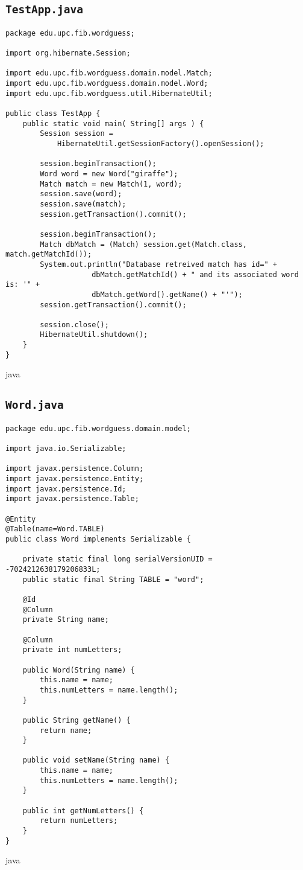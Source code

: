 \subsection{\texttt{TestApp.java}}
\begin{verbatim}
package edu.upc.fib.wordguess;

import org.hibernate.Session;

import edu.upc.fib.wordguess.domain.model.Match;
import edu.upc.fib.wordguess.domain.model.Word;
import edu.upc.fib.wordguess.util.HibernateUtil;

public class TestApp {
    public static void main( String[] args ) {
        Session session = 
            HibernateUtil.getSessionFactory().openSession();
        
        session.beginTransaction();
        Word word = new Word("giraffe");
        Match match = new Match(1, word);
        session.save(word);
        session.save(match);
        session.getTransaction().commit();
        
        session.beginTransaction();
        Match dbMatch = (Match) session.get(Match.class, match.getMatchId());
        System.out.println("Database retreived match has id=" +
                    dbMatch.getMatchId() + " and its associated word is: '" +
                    dbMatch.getWord().getName() + "'");
        session.getTransaction().commit();
        
        session.close();
        HibernateUtil.shutdown();
    }
}
\end{verbatim}{java}


\subsection{\texttt{Word.java}}
\begin{verbatim}
package edu.upc.fib.wordguess.domain.model;

import java.io.Serializable;

import javax.persistence.Column;
import javax.persistence.Entity;
import javax.persistence.Id;
import javax.persistence.Table;

@Entity
@Table(name=Word.TABLE)
public class Word implements Serializable {

    private static final long serialVersionUID = -7024212638179206833L;
    public static final String TABLE = "word";

    @Id
    @Column
    private String name;

    @Column
    private int numLetters;

    public Word(String name) {
        this.name = name;
        this.numLetters = name.length();
    }

    public String getName() {
        return name;
    }

    public void setName(String name) {
        this.name = name;
        this.numLetters = name.length();
    }

    public int getNumLetters() {
        return numLetters;
    }
}
\end{verbatim}{java}



